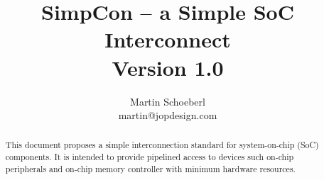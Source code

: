 \documentclass[a4paper,12pt]{scrartcl}
\begin{document}
\title{SimpCon -- a Simple SoC Interconnect\\Version 1.0}
\author{Martin Schoeberl\\ martin@jopdesign.com}
\maketitle \thispagestyle{empty}

\begin{abstract}

This document proposes a simple interconnection standard for
system-on-chip (SoC) components. It is intended to provide pipelined
access to devices such on-chip peripherals and on-chip memory
controller with minimum hardware resources.


\end{abstract}






\end{document}

